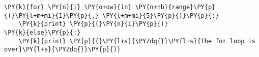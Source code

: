 \begin{Verbatim}[commandchars=\\\{\}]
\PY{k}{for} \PY{n}{i} \PY{o+ow}{in} \PY{n+nb}{range}\PY{p}{(}\PY{l+m+mi}{1}\PY{p}{,} \PY{l+m+mi}{5}\PY{p}{)}\PY{p}{:}
    \PY{k}{print} \PY{p}{(}\PY{n}{i}\PY{p}{)}
\PY{k}{else}\PY{p}{:}
    \PY{k}{print} \PY{p}{(}\PY{l+s}{\PYZdq{}}\PY{l+s}{The for loop is over}\PY{l+s}{\PYZdq{}}\PY{p}{)}
\end{Verbatim}
